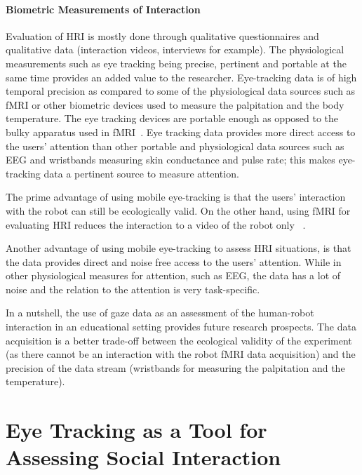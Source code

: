 \documentclass{sig-alternate}
\begin{document}
\paragraph{Biometric Measurements of Interaction}

Evaluation of HRI is mostly done through qualitative questionnaires and
qualitative data (interaction videos, interviews for example). The physiological
measurements such as eye tracking being precise, pertinent and portable at the
same time provides an added value to the researcher.  Eye-tracking data is of high temporal precision as compared to some of the physiological data sources such as fMRI or other
biometric devices used to measure the palpitation and the body temperature. The
eye tracking devices are portable enough as opposed to the bulky apparatus used
in fMRI~\cite{rosenthal2013neural}.  Eye tracking data provides more direct
access to the users' attention than other portable and physiological data
sources such as EEG and wristbands measuring skin conductance and pulse rate; this makes eye-tracking data a pertinent source to measure attention.

The prime advantage of using mobile eye-tracking is that the users' interaction
with the robot can still be ecologically valid. On the other hand, using fMRI
for evaluating HRI reduces the interaction to a video of the robot only
~\cite{rosenthal2013neural}.

Another advantage of using mobile eye-tracking to assess HRI situations, is that
the data provides direct and noise free access to the users' attention. While in
other physiological measures for attention, such as EEG, the data has a lot of
noise and the relation to the attention is very task-specific.


In a nutshell, the use of gaze data as an assessment of the human-robot
interaction in an educational setting provides future research
prospects. The data acquisition is a better trade-off between the
ecological validity of the experiment (as there cannot be an interaction
with the robot fMRI data acquisition) and the precision of the data
stream (wristbands for measuring the palpitation and the temperature).

\section{Eye Tracking as a Tool for Assessing Social Interaction}
\end{document}
